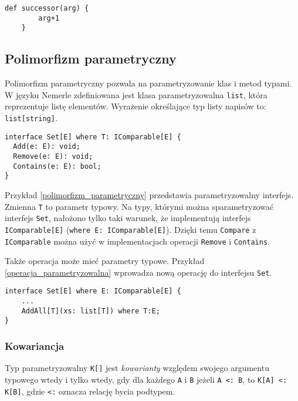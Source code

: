 \documentclass[a4paper,12pt]{mwbk}
\begin{document}
\begin{lstlisting}[style=AspectJ,caption=Funkcja lokalna,label=lokalna]
    def successor(arg) {
        arg+1
    }
\end{lstlisting}

\subsection{Polimorfizm parametryczny}\label{polim_parametryczny}

Polimorfizm parametryczny pozwala na parametryzowanie klas i metod typami. W
języku Nemerle zdefiniowana jest klasa parametryzowalna \lstinline!list!, która
reprezentuje listę elementów. Wyrażenie określające typ listy napisów to:
\lstinline!list[string]!.


\begin{lstlisting}[style=AspectJ,caption=Klasa parametryzowalna,label=polimorfizm_parametryczny]
interface Set[E] where T: IComparable[E] {
  Add(e: E): void;
  Remove(e: E): void;
  Contains(e: E): bool;
}
\end{lstlisting}

Przykład \ref{polimorfizm_parametryczny} przedstawia parametryzowalny
interfejs. Zmienna \lstinline!T! to parametr typowy. Na typy, którymi można
sparametryzować interfejs \lstinline!Set!, nałożono tylko taki warunek, że
implementują interfejs \lstinline!IComparable[E]! (\lstinline!where E: IComparable[E]!). 
Dzięki temu \lstinline!Compare! z \lstinline!IComparable! można użyć w implementacjach operacji
\lstinline!Remove! i \lstinline!Contains!.

Także operacja może mieć parametry typowe. Przykład \ref{operacja_parametryzowalna}
wprowadza nową operację do interfejsu \lstinline!Set!. 

\begin{lstlisting}[style=AspectJ,caption=Operacja parametryzowalna,label=operacja_parametryzowalna]
interface Set[E] where E: IComparable[E] {
    ...
    AddAll[T](xs: list[T]) where T:E;
}
\end{lstlisting}

\subsubsection{Kowariancja}\label{nemerle.kowariancja}

Typ parametryzowalny \lstinline!K[]! jest \emph{kowarianty} względem swojego
argumentu typowego wtedy i tylko wtedy, gdy
dla każdego \lstinline!A! i \lstinline!B!  jeżeli \lstinline!A <: B!, to 
\lstinline!K[A] <: K[B]!, gdzie \lstinline!<:! oznacza
relację bycia podtypem.
\end{document}
